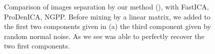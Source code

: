\begin{figure}[t]
\begin{center}
\end{center}
\caption{Comparison of images separation by our method (\ICA), with FastICA,  ProDenICA, NGPP. Before mixing by a linear matrix, we added to the first two components given in (a) the third component given by random
normal noise. As we see \ICA{} was able to perfectly recover the two first components.}
\label{fig:image_ICA_int}
\end{figure}

